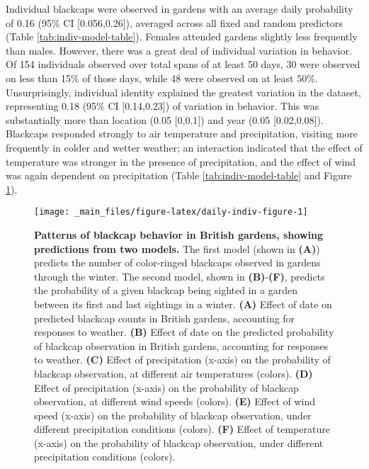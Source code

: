 \documentclass[a4paper, nobind]{templates/ociamthesis}
\begin{document}
Individual blackcaps were observed in gardens with an average daily probability of 0.16 (95\% CI {[}0.056,0.26{]}), averaged across all fixed and random predictors (Table \ref{tab:indiv-model-table}). Females attended gardens slightly less frequently than males. However, there was a great deal of individual variation in behavior. Of 154 individuals observed over total spans of at least 50 days, 30 were observed on less than 15\% of those days, while 48 were observed on at least 50\%. Unsurprisingly, individual identity explained the greatest variation in the dataset, representing 0.18 (95\% CI {[}0.14,0.23{]}) of variation in behavior. This was substantially more than location (0.05 {[}0,0.1{]}) and year (0.05 {[}0.02,0.08{]}). Blackcaps responded strongly to air temperature and precipitation, visiting more frequently in colder and wetter weather; an interaction indicated that the effect of temperature was stronger in the presence of precipitation, and the effect of wind was again dependent on precipitation (Table \ref{tab:indiv-model-table} and Figure \ref{fig:daily-indiv-figure}).



\begin{figure}
\texttt{[image: \_main\_files/figure-latex/daily-indiv-figure-1]} \caption{\textbf{Patterns of blackcap behavior in British gardens, showing predictions from two models.} The first model (shown in \textbf{(A)}) predicts the number of color-ringed blackcaps observed in gardens through the winter. The second model, shown in \textbf{(B)}-\textbf{(F)}, predicts the probability of a given blackcap being sighted in a garden between its first and last sightings in a winter. \textbf{(A)} Effect of date on predicted blackcap counts in British gardens, accounting for responses to weather. \textbf{(B)} Effect of date on the predicted probability of blackcap observation in British gardens, accounting for responses to weather. \textbf{(C)} Effect of precipitation (x-axis) on the probability of blackcap observation, at different air temperatures (colors). \textbf{(D)} Effect of precipitation (x-axis) on the probability of blackcap observation, at different wind speeds (colors). \textbf{(E)} Effect of wind speed (x-axis) on the probability of blackcap observation, under different precipitation conditions (colors). \textbf{(F)} Effect of temperature (x-axis) on the probability of blackcap observation, under different precipitation conditions (colors).}\label{fig:daily-indiv-figure}
\end{figure}
\end{document}
